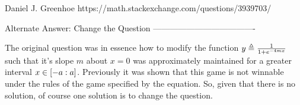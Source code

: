 Daniel J. Greenhoe
https://math.stackexchange.com/questions/3939703/

Alternate Answer: Change the Question
-------------------------------------
$\newcommand{\eqd}{\triangleq}$
$\newcommand{\eqa}{\approx}$
$\newcommand{\abs}[1]{{\left\lvert #1 \right\rvert}}$
$\newcommand{\brp}[1]{{\left(#1\right)}}$
$\newcommand{\brs}[1]{{\left[#1\right]}}$
$\newcommand{\brlr}[1]{\left.#1\right|}$
$\newcommand{\deriv} [2]   {{\frac{\mathrm{d}#1}{\mathrm{d}#2} }}$
$\newcommand{\R}{\Bbb{R}}$
$\newcommand{\intcc} [2]  {{\left[#1:#2\right]}}$
$\newcommand{\intoo} [2]  {{\left(#1:#2\right)}}$
$\newcommand{\intoc} [2]  {{\left(#1:#2\right]}}$
$\newcommand{\intco} [2]  {{\left[#1:#2\right)}}$
$\newcommand{\ff}{\mathrm{f}}$
$\newcommand{\fg}{\mathrm{g}}$
$\newcommand{\fphi}{\mathrm{\phi}}$
$\newcommand{\dx}{\mathrm{dx}}$
$\newcommand{\du}{\mathrm{du}}$
$\newcommand{\dv}{\mathrm{dv}}$

The original question was in essence how to modify the function $y\eqd\frac{1}{1+e^{-4mx}}$ such that it's slope $m$ about $x=0$ was approximately maintained for a greater interval $x\in\intcc{-a}{a}$. Previously it was shown that this game is not winnable under the rules of the game specified by the equation. So, given that there is no solution, of course one solution is to change the question.

